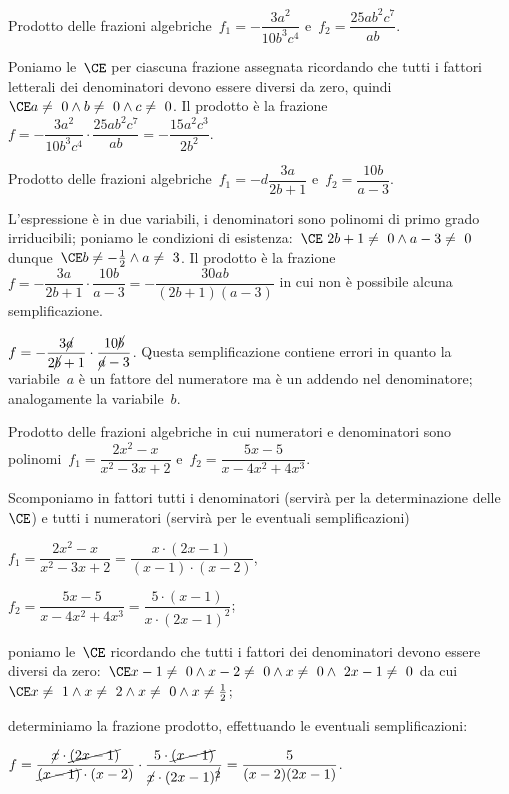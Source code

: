 \begin{exrig}
 \begin{esempio}
Prodotto delle frazioni algebriche~$f_{1}=-{\dfrac{3a^{2}}{10b^{3}c^{4}}}$ e~$f_{2}=\dfrac{25ab^{2}c^{7}}{ab}$.

Poniamo le~$\CE$ per ciascuna frazione assegnata ricordando che tutti i fattori letterali dei denominatori devono essere diversi da zero,
quindi~$\CE a\neq~0\wedge b\neq~0\wedge c\neq~0$.
Il prodotto è la frazione~$f=-\dfrac{3a^{2}}{10b^{3}c^{4}}\cdot\dfrac{25ab^{2}c^{7}}{ab}=-\dfrac{15a^{2}c^{3}}{2b^{2}}$.
 \end{esempio}

 \begin{esempio}
Prodotto delle frazioni algebriche~$f_{1}=-{d\dfrac{3a}{2b+1}}$ e~$f_{2}=\dfrac{10b}{a-3}$.

L’espressione è in due variabili, i denominatori sono polinomi di primo grado irriducibili; poniamo le condizioni di
esistenza:~$\CE~2b+1\neq~0\wedge a-3\neq~0$ dunque~$\CE b\neq -{\frac{1}{2}}\wedge a\neq~3$.
Il prodotto è la frazione~$f=-{\dfrac{3a}{2b+1}}\cdot\dfrac{10b}{a-3}=-{\dfrac{30ab}{(2b+1)(a-3)}}$ in cui non è possibile alcuna semplificazione.

\osservazione
$f=-{\dfrac{3\cancel{a}}{2\cancel{b}+1}}\cdot\dfrac{10\cancel{b}}{\cancel{a}-3}$. Questa semplificazione
contiene errori in quanto la variabile~$a$ è un fattore del numeratore ma è un addendo nel denominatore; analogamente la
variabile~$b$.
 \end{esempio}

 \begin{esempio}
Prodotto delle frazioni algebriche in cui numeratori e denominatori sono polinomi~$f_{{1}}=\dfrac{2x^{2}-x}{x^{2}-3x+2}$
e~$f_{2}=\dfrac{5x-5}{x-4x^{2}+4x^{3}}$.
\begin{itemize*}
 \item Scomponiamo in fattori tutti i denominatori (servirà per la determinazione delle~$\CE$) e
    tutti i numeratori (servirà per le eventuali semplificazioni)
  \begin{itemize*}
  \item $f_{1}=\dfrac{2x^{2}-x}{x^{2}-3x+2}=\dfrac{x\cdot(2x-1)}{(x-1)\cdot(x-2)}$,
  \item $f_{2}=\dfrac{5x-5}{x-4x^{2}+4x^{3}}=\dfrac{5\cdot(x-1)}{x\cdot(2x-1)^{2}}$;
  \end{itemize*}
 \item poniamo le~$\CE$ ricordando che tutti i fattori dei denominatori devono essere diversi da
	zero:~$\CE x-1\neq~0\wedge x-2\neq~0\wedge x\neq~0\wedge~2x-1\neq~0$ da cui~$\CE x\neq~1\wedge x\neq~2\wedge x\neq~0\wedge x\neq \frac{1}{2}$;
 \item determiniamo la frazione prodotto, effettuando le eventuali semplificazioni:
  \begin{itemize*}
  \item $f=\dfrac{\cancel{x}\cdot\cancel{(2x-1)}}{\cancel{(x-1)}\cdot{(x-2)}}\cdot\dfrac{5\cdot\cancel{(x-1)}}{\cancel{x}\cdot(2x-1)^{\cancel{2}}}=
     \dfrac{5}{(x-2)(2x-1)}$.
  \end{itemize*}
\end{itemize*}
\end{esempio}
\end{exrig}

